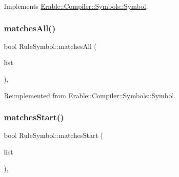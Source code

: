 Implements \mbox{\hyperlink{class_erable_1_1_compiler_1_1_symbols_1_1_symbol_a63b41d0942e5d65288fa3fc9d466ab43}{Erable\+::\+Compiler\+::\+Symbols\+::\+Symbol}}.

\mbox{\label{class_erable_1_1_compiler_1_1_symbols_1_1_rule_symbol_a690e797889b403487385955dc3fe7501}} 
\subsubsection{\texorpdfstring{matchesAll()}{matchesAll()}}
{\footnotesize\ttfamily bool Rule\+Symbol\+::matches\+All (\begin{DoxyParamCaption}\item[{Data\+::\+Data\+Deque}]{list }\end{DoxyParamCaption})\hspace{0.3cm}{\ttfamily [override]}, {\ttfamily [virtual]}}



Reimplemented from \mbox{\hyperlink{class_erable_1_1_compiler_1_1_symbols_1_1_symbol_a49dd91010baf238ed0d639004c3ec9ba}{Erable\+::\+Compiler\+::\+Symbols\+::\+Symbol}}.

\mbox{\label{class_erable_1_1_compiler_1_1_symbols_1_1_rule_symbol_a965c2e3ba84c2e93c5ebbce5003b721b}} 
\subsubsection{\texorpdfstring{matchesStart()}{matchesStart()}}
{\footnotesize\ttfamily bool Rule\+Symbol\+::matches\+Start (\begin{DoxyParamCaption}\item[{Data\+::\+Data\+Deque}]{list }\end{DoxyParamCaption})\hspace{0.3cm}{\ttfamily [override]}, {\ttfamily [virtual]}}



